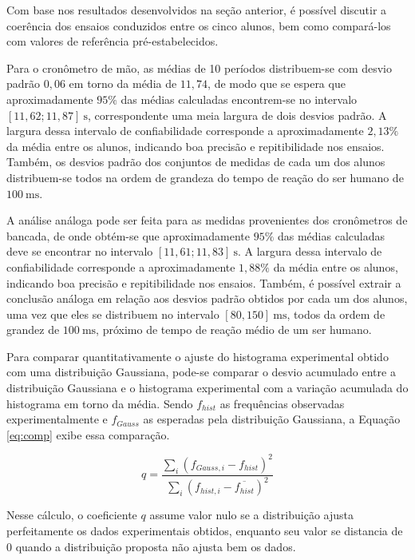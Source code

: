 \documentclass[12pt, a4paper, brazil]{article}
\begin{document}
Com base nos resultados desenvolvidos na seção anterior, é possível discutir a coerência dos ensaios conduzidos entre os cinco alunos, bem como compará-los com valores de referência pré-estabelecidos.

Para o cronômetro de mão, as médias de 10 períodos distribuem-se com desvio padrão $0,06$ em torno da média de $11,74$, de modo que se espera que aproximadamente $95\%$ das médias calculadas encontrem-se no intervalo $[11,62;11,87]\ \text{s}$, correspondente uma meia largura de dois desvios padrão\cite{vuolo2019}. A largura dessa intervalo de confiabilidade corresponde a aproximadamente $2,13\%$ da média entre os alunos, indicando boa precisão e repitibilidade nos ensaios. Também, os desvios padrão dos conjuntos de medidas de cada um dos alunos distribuem-se todos na ordem de grandeza do tempo de reação do ser humano de $100\ \text{ms}$\cite{vuolo2019}.

A análise análoga pode ser feita para as medidas provenientes dos cronômetros de bancada, de onde obtém-se que aproximadamente $95\%$ das médias calculadas deve se encontrar no intervalo $[11,61; 11,83]\ \text{s}$. A largura dessa intervalo de confiabilidade corresponde a aproximadamente $1,88\%$ da média entre os alunos, indicando boa precisão e repitibilidade nos ensaios. Também, é possível extrair a conclusão análoga em relação aos desvios padrão obtidos por cada um dos alunos, uma vez que eles se distribuem no intervalo $[80, 150]\ \text{ms}$, todos da ordem de grandez de $100\ \text{ms}$, próximo de tempo de reação médio de um ser humano\cite{vuolo2019}.


Para comparar quantitativamente o ajuste do histograma experimental obtido com uma distribuição Gaussiana, pode-se comparar o desvio acumulado entre a distribuição Gaussiana e o histograma experimental com a variação acumulada do histograma em torno da média. Sendo $f_{hist}$ as frequências observadas experimentalmente e $f_{Gauss}$ as esperadas pela distribuição Gaussiana, a Equação \ref{eq:comp} exibe essa comparação\cite{barrosneto2001}.

\begin{equation}\label{eq:comp}
	q = \frac{\sum_{i}(f_{Gauss,i}-{f_{hist}})^2}{\sum_{i}(f_{hist, i}-\overline{f_{hist}})^2}
\end{equation}

Nesse cálculo, o coeficiente $q$ assume valor nulo se a distribuição ajusta perfeitamente os dados experimentais obtidos, enquanto seu valor se distancia de $0$ quando a distribuição proposta não ajusta bem os dados.
\end{document}
